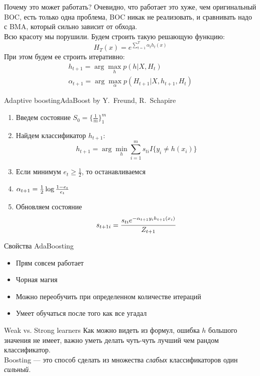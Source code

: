 \documentclass[14pt, fleqn, xcolor={dvipsnames, table}]{beamer}
\begin{document}
\begin{frame}{Почему это может работать?}
\small
Очевидно, что работает это хуже, чем оригинальный BOC, есть только одна проблема, BOC никак не реализовать, и сравнивать надо с BMA, который сильно зависит от обхода. \\
Всю красоту мы порушили. Будем строить такую решающую функцию:
$$
H_T(x) = e^{\sum_{t=1}^T \alpha_t h_t(x)}
$$
При этом будем ее строить итеративно:
$$\begin{array}{l}
h_{t+1} = \arg \max_{h} p(h | X,H_t) \\
\alpha_{t+1} = \arg \max_{\alpha} p(H_{t+1} | X, h_{t+1}, H_t)
\end{array}$$
\end{frame}

\begin{frame}{Adaptive boosting}{AdaBoost by Y.~Freund, R.~Schapire}
\begin{enumerate}
  \item Введем состояние $S_0 = \{\frac{1}{m}\}_1^m$
  \item Найдем классификатор $h_{t+1}$:
  $$h_{t+1} = \arg \min_h \sum_{i=1}^m s_{ti} I\{y_i \ne h(x_i)\} $$
  \item Если минимум $e_t \ge \frac{1}{2}$, то останавливаемся
  \item $\alpha_{t+1} = \frac{1}{2}\log{1 - e_t \over e_t}$
  \item Обновляем состояние
  $$s_{t+1i} = {s_{ti} e^{-\alpha_{t+1} y_i h_{t+1}(x_i)} \over Z_{t+1}}$$
\end{enumerate}
\end{frame}

\begin{frame}{Свойства AdaBoosting}{}
\begin{itemize}
  \item Прям совсем работает
  \item Ч\textit{о}рная магия
  \item Можно переобучить при определенном количестве итераций
  \item Умеет обучаться после того как все угадал
\end{itemize}
\end{frame}

\begin{frame}{Weak vs. Strong learners}
Как можно видеть из формул, ошибка $h$ большого значения не имеет, важно уметь делать чуть-чуть лучший чем рандом классификатор.\\
Boosting --- это способ сделать из множества \textit{слабых} классификаторов один \textit{сильный}.
\end{frame}
\end{document}

